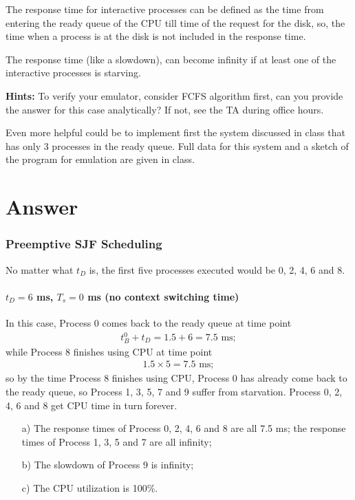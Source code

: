 \documentclass[12pt,letterpaper]{article}
\begin{document}
The response time for interactive processes can be defined as the time from
entering the ready queue of the CPU till time of the request for the disk, so, the time
when a process is at the disk is not included in the response time.

The response time (like a slowdown), can become infinity if at least one of the
interactive processes is starving.

{\bf Hints:} To verify your emulator, consider FCFS algorithm first, can you provide
the answer for this case analytically? If not, see the TA during office hours.

Even more helpful could be to implement first the system discussed in class that
has only 3 processes in the ready queue. Full data for this system and a sketch of the
program for emulation are given in class.

\part*{Answer}
\section{Preemptive SJF Scheduling}
No matter what $t_D$ is, the first five processes executed would be 0, 2, 4, 6 and 8.

\subsection{$t_D=6$ ms, $T_s = 0$ ms (no context switching time)} 
In this case, Process 0 comes back to the ready queue at time point 
\begin{eqnarray}
t_B^0+t_D=1.5+6=7.5\textrm{ ms};
\end{eqnarray}
while Process 8 finishes using CPU at time point 
\begin{eqnarray}
1.5\times5=7.5\textrm{ ms};
\end{eqnarray}
so by the time Process 8 finishes using CPU, Process 0 has already come back to the ready queue, so Process 1, 3, 5, 7 and 9 suffer from starvation. Process 0, 2, 4, 6 and 8 get CPU time in turn forever.
\begin{enumerate}
\item[a)] The response times of Process 0, 2, 4, 6 and 8 are all 7.5 ms; the response times of Process 1, 3, 5 and 7 are all infinity;
\item[b)] The slowdown of Process 9 is infinity;
\item[c)] The CPU utilization is 100\%.
\end{enumerate}
\end{document}

